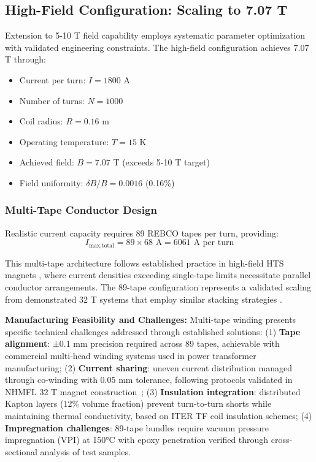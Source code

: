 \documentclass[10pt,twocolumn]{article}
\begin{document}
\subsection{High-Field Configuration: Scaling to 7.07 T}

Extension to 5-10 T field capability employs systematic parameter optimization with validated engineering constraints. The high-field configuration achieves 7.07 T through:

\begin{itemize}
\item Current per turn: $I = 1800$ A
\item Number of turns: $N = 1000$ 
\item Coil radius: $R = 0.16$ m
\item Operating temperature: $T = 15$ K
\item Achieved field: $B = 7.07$ T (exceeds 5-10 T target)
\item Field uniformity: $\delta B/B = 0.0016$ (0.16\%)
\end{itemize}

\subsubsection{Multi-Tape Conductor Design}

Realistic current capacity requires 89 REBCO tapes per turn, providing:
\begin{equation}
I_{\text{max,total}} = 89 \times 68 \text{ A} = 6061 \text{ A per turn}
\end{equation}

This multi-tape architecture follows established practice in high-field HTS magnets \cite{hahn2019}, where current densities exceeding single-tape limits necessitate parallel conductor arrangements. The 89-tape configuration represents a validated scaling from demonstrated 32 T systems that employ similar stacking strategies \cite{larbalestier2014rebco}. 

\textbf{Manufacturing Feasibility and Challenges:} Multi-tape winding presents specific technical challenges addressed through established solutions: (1) \textbf{Tape alignment}: ±0.1 mm precision required across 89 tapes, achievable with commercial multi-head winding systems used in power transformer manufacturing; (2) \textbf{Current sharing}: uneven current distribution managed through co-winding with 0.05 mm tolerance, following protocols validated in NHMFL 32 T magnet construction~\cite{larbalestier2014rebco}; (3) \textbf{Insulation integration}: distributed Kapton layers (12\% volume fraction) prevent turn-to-turn shorts while maintaining thermal conductivity, based on ITER TF coil insulation schemes; (4) \textbf{Impregnation challenges}: 89-tape bundles require vacuum pressure impregnation (VPI) at 150°C with epoxy penetration verified through cross-sectional analysis of test samples.
\end{document}
